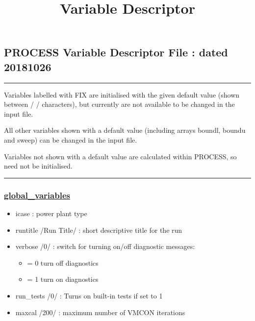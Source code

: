 \documentclass[]{article}
\title{Variable Descriptor}
\author{}
\date{}
\begin{document}
\maketitle

\subsection{PROCESS Variable Descriptor File : dated 20181026}

\begin{center}\rule{3in}{0.4pt}\end{center}

Variables labelled with FIX are initialised with the given default value
(shown between / / characters), but currently are not available to be
changed in the input file.

All other variables shown with a default value (including arrays boundl,
boundu and sweep) can be changed in the input file.

Variables not shown with a default value are calculated within PROCESS,
so need not be initialised.

\begin{center}\rule{3in}{0.4pt}\end{center}

\subsubsection{\href{global_variables.html}{global\_variables}}

\begin{itemize}
\itemsep1pt\parskip0pt
\item
  icase : power plant type
\item
  runtitle /Run Title/ : short descriptive title for the run
\item
  verbose /0/ : switch for turning on/off diagnostic messages:

  \begin{itemize}
  \itemsep1pt\parskip0pt
  \item
    = 0 turn off diagnostics
  \item
    = 1 turn on diagnostics
  \end{itemize}
\item
  run\_tests /0/ : Turns on built-in tests if set to 1
\item
  maxcal /200/ : maximum number of VMCON iterations
\end{itemize}
\end{document}

